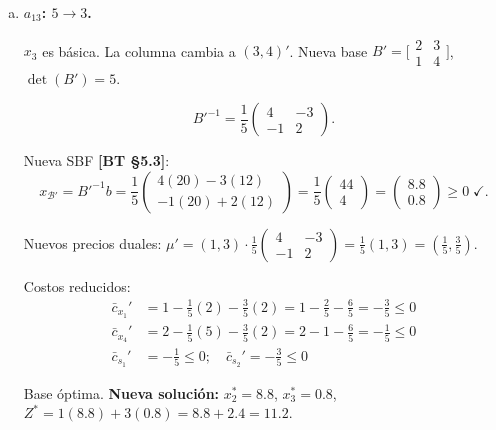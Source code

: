 \documentclass{article}
\begin{document}
\begin{enumerate}[a)]
Nuevo diccionario:
\begin{align*}
x_1 &= 2 - \tfrac{3}{2}x_3 + \tfrac{1}{2}x_4 + \tfrac{1}{2}s_1 - s_2 \\
x_2 &= 8 - x_3 - 3x_4 - s_1 + s_2 \\
Z   &= 12 - x_3 - s_2
\end{align*}

Costos reducidos: $x_3: -1 \leq 0$; $x_4: 0$; $s_1: 0$; $s_2: -1 \leq 0$. Óptimo \textbf{[BT §3.2]}.

\item \textbf{$a_{13}$: $5 \to 3$.}

$x_3$ es básica. La columna cambia a $(3, 4)'$. Nueva base $B' = \bigl[\!\begin{smallmatrix}2&3\\1&4\end{smallmatrix}\!\bigr]$, $\det(B')=5$.

\[
  B'^{-1} = \frac{1}{5}\begin{pmatrix}4 & -3 \\ -1 & 2\end{pmatrix}.
\]

Nueva SBF \textbf{[BT §5.3]}:
\[
  x_{\mathcal{B}'} = B'^{-1}b = \frac{1}{5}\begin{pmatrix}4(20)-3(12)\\-1(20)+2(12)\end{pmatrix} = \frac{1}{5}\begin{pmatrix}44\\4\end{pmatrix} = \begin{pmatrix}8.8\\0.8\end{pmatrix} \geq 0\;\checkmark.
\]

Nuevos precios duales: $\mu' = (1,3)\cdot\frac{1}{5}\begin{pmatrix}4&-3\\-1&2\end{pmatrix} = \frac{1}{5}(1,3) = \left(\tfrac{1}{5},\tfrac{3}{5}\right)$.

Costos reducidos:
\begin{align*}
\bar{c}_{x_1}' &= 1 - \tfrac{1}{5}(2) - \tfrac{3}{5}(2) = 1 - \tfrac{2}{5} - \tfrac{6}{5} = -\tfrac{3}{5} \leq 0 \\
\bar{c}_{x_4}' &= 2 - \tfrac{1}{5}(5) - \tfrac{3}{5}(2) = 2-1-\tfrac{6}{5} = -\tfrac{1}{5} \leq 0 \\
\bar{c}_{s_1}' &= -\tfrac{1}{5} \leq 0;\quad \bar{c}_{s_2}' = -\tfrac{3}{5} \leq 0
\end{align*}

Base óptima. \textbf{Nueva solución:} $x_2^* = 8.8$, $x_3^* = 0.8$, $Z^* = 1(8.8) + 3(0.8) = 8.8 + 2.4 = \mathbf{11.2}$.

\end{enumerate}
\end{document}
